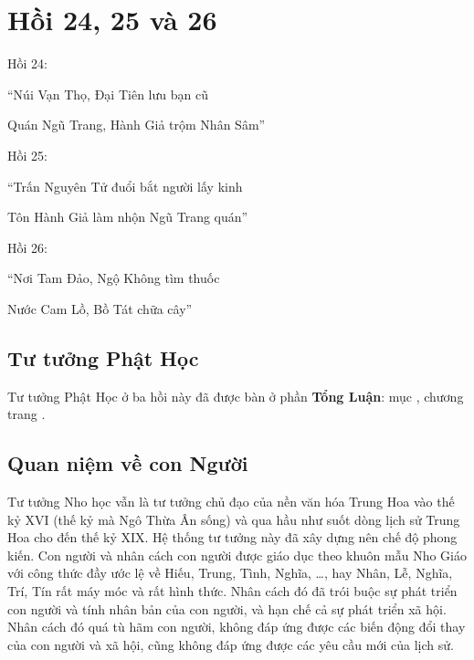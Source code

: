 \chapter{Hồi 24, 25 và 26} %
\label{cha:hoi_24_25_26}

Hồi 24:

\begin{itshape}
``Núi Vạn Thọ, Đại Tiên lưu bạn cũ

Quán Ngũ Trang, Hành Giả trộm Nhân Sâm''
\end{itshape}

Hồi 25:

\begin{itshape}
``Trấn Nguyên Tử đuổi bắt người lấy kinh

Tôn Hành Giả làm nhộn Ngũ Trang quán''
\end{itshape}

Hồi 26:

\begin{itshape}
``Nơi Tam Đảo, Ngộ Không tìm thuốc

Nước Cam Lồ, Bồ Tát chữa cây''
\end{itshape}

\section{Tư tưởng Phật Học} %
\label{sec:24_25_26_phat_hoc}

Tư tưởng Phật Học ở ba hồi này đã được bàn ở phần {\bf Tổng Luận}: mục , chương  trang \pageref{sec:bieu_tuong_cua_hoi_thu_26}.

\section{Quan niệm về con Người} %
\label{sec:24_25_26_con_nguoi}

Tư tưởng Nho học vẫn là tư tưởng chủ đạo của nền văn hóa Trung Hoa vào thế kỷ XVI (thế kỷ mà Ngô Thừa Ân sống) và qua hầu như suốt dòng lịch sử Trung Hoa cho đến thế kỷ XIX. Hệ thống tư tưởng này đã xây dựng nên chế độ phong kiến. Con người và nhân cách con người được giáo dục theo khuôn mẫu Nho Giáo với công thức đầy ước lệ về Hiếu, Trung, Tình, Nghĩa, \ldots, hay Nhân, Lễ, Nghĩa, Trí, Tín rất máy móc và rất hình thức. Nhân cách đó đã trói buộc sự phát triển con người và tính nhân bản của con người, và hạn chế cả sự phát triển xã hội. Nhân cách đó quá tù hãm con người, không đáp ứng được các biến động đổi thay của con người và xã hội, cũng không đáp ứng được các yêu cầu mới của lịch sử.

